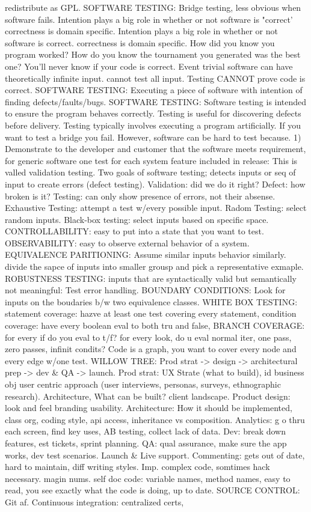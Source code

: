 \documentclass[10pt]{article}
\begin{document}
\begin{landscape}
\begin{multicols*}{6}
redistribute as GPL. SOFTWARE TESTING: Bridge testing, less obvious when software fails. Intention plays a big role in whether or not software is "correct' correctness is domain specific. Intention plays a big role in whether or not software is correct. correctness is domain specific. How did you know you program worked? How do you know the tournament you generated was the best one? You'll never know if your code is correct. Event trivial software can have theoretically infinite input. cannot test all input. Testing CANNOT prove code is correct. SOFTWARE TESTING: Executing a piece of software with intention of finding defects/faults/bugs. SOFTWARE TESTING: Software testing is intended to ensure the program behaves correctly. Testing is useful for discovering defects before delivery. Testing typically involves executing a program artificially. If you want to test a bridge you fail. However, software can be hard to test because. 1) Demonstrate to the developer and customer that the software meets requirement, for generic software one test for each system feature included in release: This is valled validation testing. Two goals of software testing; detects inputs or seq of input to create errors (defect testing). Validation: did we do it right? Defect: how broken is it? Testing: can only show presence of errors, not their absense. Exhaustive Testing: attempt a test w/every possible input. Radom Testing: select random inputs. Black-box testing: select inputs based on specific space. CONTROLLABILITY: easy to put into a state that you want to test. OBSERVABILITY: easy to observe external behavior of a system. EQUIVALENCE PARITIONING: Assume similar inputs behavior similarly. divide the sapce of inputs into smaller grousp and pick a representative exmaple. ROBUSTNESS TESTING: inputs that are syntactically valid but semantically not meaningful: Test error handling. BOUNDARY CONDITIONS: Look for inputs on the boudaries b/w two equivalence classes. WHITE BOX TESTING: statement coverage: hazve at least one test covering every statement, condition coverage: have every boolean eval to both tru and false, BRANCH COVERAGE: for every if do you eval to t/f? for every look, do u eval normal iter, one pass, zero passes, infinit condits? Code is a graph, you want to cover every node and every edge w/one test. WILLOW TREE: Prod strat -> design -> architectural prep -> dev \& QA -> launch. Prod strat: UX Strate (what to build), id business obj user centric approach (user interviews, personas, surveys, ethnographic research). Architecture, What can be built? client landscape. Product design: look and feel branding usability. Architecture: How it should be implemented, class org, coding style, api access, inheritance vs composition. Analytics: g o thru each screen, find key uses, AB testing, collect lack of data. Dev: break down features, est tickets, sprint planning. QA: qual assurance, make sure the app works, dev test scenarios. Launch \& Live support. Commenting: gets out of date, hard to maintain, diff writing styles. Imp. complex code, somtimes hack necessary. magin nums. self doc code: variable names, method names, easy to read, you see exactly what the code is doing, up to date. SOURCE CONTROL: Git af. Continuous integration: centralized certs, 
\end{multicols*}
\end{landscape}
\end{document}
